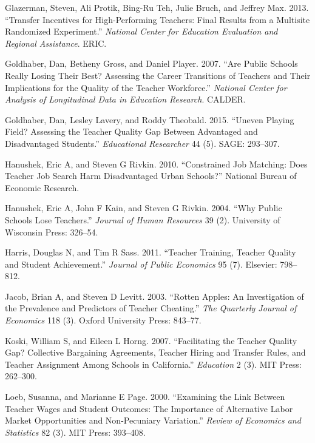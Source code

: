 \documentclass[12pt,]{article}
\begin{document}
\hypertarget{ref-glazerman}{}
Glazerman, Steven, Ali Protik, Bing-Ru Teh, Julie Bruch, and Jeffrey
Max. 2013. ``Transfer Incentives for High-Performing Teachers: Final
Results from a Multisite Randomized Experiment.'' \emph{National Center
for Education Evaluation and Regional Assistance}. ERIC.

\hypertarget{ref-goldhaber2007}{}
Goldhaber, Dan, Betheny Gross, and Daniel Player. 2007. ``Are Public
Schools Really Losing Their Best? Assessing the Career Transitions of
Teachers and Their Implications for the Quality of the Teacher
Workforce.'' \emph{National Center for Analysis of Longitudinal Data in
Education Research}. CALDER.

\hypertarget{ref-goldhaber2015}{}
Goldhaber, Dan, Lesley Lavery, and Roddy Theobald. 2015. ``Uneven
Playing Field? Assessing the Teacher Quality Gap Between Advantaged and
Disadvantaged Students.'' \emph{Educational Researcher} 44 (5). SAGE:
293--307.

\hypertarget{ref-hanushek2010}{}
Hanushek, Eric A, and Steven G Rivkin. 2010. ``Constrained Job Matching:
Does Teacher Job Search Harm Disadvantaged Urban Schools?'' National
Bureau of Economic Research.

\hypertarget{ref-hanushek}{}
Hanushek, Eric A, John F Kain, and Steven G Rivkin. 2004. ``Why Public
Schools Lose Teachers.'' \emph{Journal of Human Resources} 39 (2).
University of Wisconsin Press: 326--54.

\hypertarget{ref-harris}{}
Harris, Douglas N, and Tim R Sass. 2011. ``Teacher Training, Teacher
Quality and Student Achievement.'' \emph{Journal of Public Economics} 95
(7). Elsevier: 798--812.

\hypertarget{ref-jacob}{}
Jacob, Brian A, and Steven D Levitt. 2003. ``Rotten Apples: An
Investigation of the Prevalence and Predictors of Teacher Cheating.''
\emph{The Quarterly Journal of Economics} 118 (3). Oxford University
Press: 843--77.

\hypertarget{ref-koski}{}
Koski, William S, and Eileen L Horng. 2007. ``Facilitating the Teacher
Quality Gap? Collective Bargaining Agreements, Teacher Hiring and
Transfer Rules, and Teacher Assignment Among Schools in California.''
\emph{Education} 2 (3). MIT Press: 262--300.

\hypertarget{ref-loeb}{}
Loeb, Susanna, and Marianne E Page. 2000. ``Examining the Link Between
Teacher Wages and Student Outcomes: The Importance of Alternative Labor
Market Opportunities and Non-Pecuniary Variation.'' \emph{Review of
Economics and Statistics} 82 (3). MIT Press: 393--408.
\end{document}
